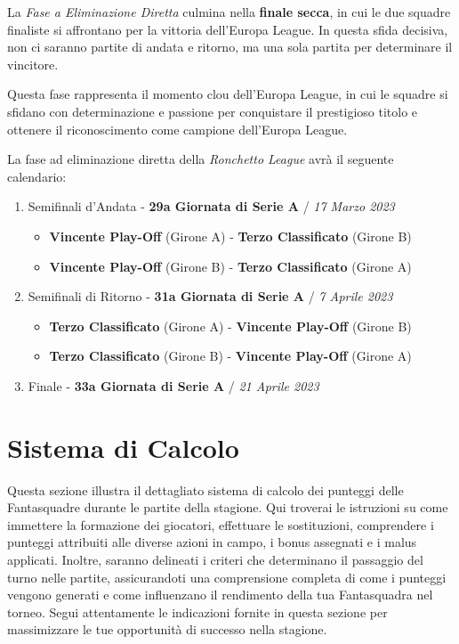 \documentclass[12pt]{article}
\begin{document}
La \textit{Fase a Eliminazione Diretta} culmina nella \textbf{finale secca}, in cui le due squadre finaliste si affrontano per la vittoria dell'Europa League. In questa sfida decisiva, non ci saranno partite di andata e ritorno, ma una sola partita per determinare il vincitore.

Questa fase rappresenta il momento clou dell'Europa League, in cui le squadre si sfidano con determinazione e passione per conquistare il prestigioso titolo e ottenere il riconoscimento come campione dell'Europa League.

La fase ad eliminazione diretta della \textit{Ronchetto League} avrà il seguente calendario:
\begin{enumerate}
    \item Semifinali d'Andata - \textbf{29a Giornata di Serie A} / \textit{17 Marzo 2023}
    \begin{itemize}
        \item \textbf{Vincente Play-Off} (Girone A) - \textbf{Terzo Classificato} (Girone B) 
        \item \textbf{Vincente Play-Off} (Girone B) - \textbf{Terzo Classificato} (Girone A) 
    \end{itemize}
    \item Semifinali di Ritorno - \textbf{31a Giornata di Serie A} / \textit{7 Aprile 2023}
    \begin{itemize}
        \item \textbf{Terzo Classificato} (Girone A) - \textbf{Vincente Play-Off} (Girone B) 
        \item \textbf{Terzo Classificato} (Girone B) - \textbf{Vincente Play-Off} (Girone A) 
    \end{itemize}
    \item Finale - \textbf{33a Giornata di Serie A} / \textit{21 Aprile 2023}
\end{enumerate}

\newpage
\section{Sistema di Calcolo}
\label{subsec:sistema-di-calcolo}

Questa sezione illustra il dettagliato sistema di calcolo dei punteggi delle Fantasquadre durante le partite della stagione. Qui troverai le istruzioni su come immettere la formazione dei giocatori, effettuare le sostituzioni, comprendere i punteggi attribuiti alle diverse azioni in campo, i bonus assegnati e i malus applicati. Inoltre, saranno delineati i criteri che determinano il passaggio del turno nelle partite, assicurandoti una comprensione completa di come i punteggi vengono generati e come influenzano il rendimento della tua Fantasquadra nel torneo. Segui attentamente le indicazioni fornite in questa sezione per massimizzare le tue opportunità di successo nella stagione.
\end{document}
